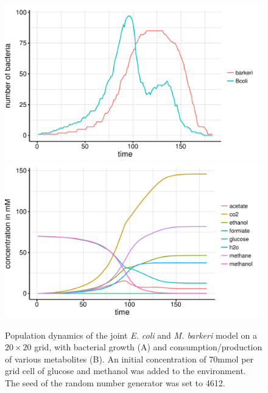 \begin{figure}[h!]
  \centering
    \includegraphics[scale=0.45]{../results/barkeri_ecoli_20x20_seed4612_growth.pdf}
    \includegraphics[scale=0.45]{../results/barkeri_ecoli_20x20_seed4612_subs.pdf}
  \caption{Population dynamics of the joint \emph{E. coli} and \emph{M. barkeri} model on a $20\times20$ grid, with bacterial growth (A) and consumption/production of various metabolites (B). An initial concentration of 70\;mmol per grid cell of glucose and methanol was added to the environment. The seed of the random number generator was set to 4612.}
  \label{fig:besg}
\end{figure}
